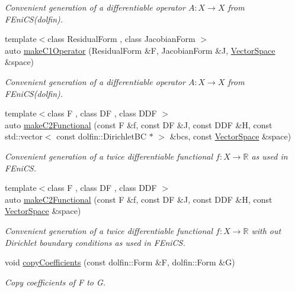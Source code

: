 \begin{DoxyCompactItemize}
\begin{DoxyCompactList}\small\item\em Convenient generation of a differentiable operator $A: X\rightarrow X$ from F\+Eni\+CS(dolfin). \end{DoxyCompactList}\item 
{\footnotesize template$<$class Residual\+Form , class Jacobian\+Form $>$ }\\auto \hyperlink{namespaceSpacy_1_1FEniCS_a508af586ecdbc9f099759ffec06e99df}{make\+C1\+Operator} (Residual\+Form \&F, Jacobian\+Form \&J, \hyperlink{classSpacy_1_1VectorSpace}{Vector\+Space} \&space)
\begin{DoxyCompactList}\small\item\em Convenient generation of a differentiable operator $A: X\rightarrow X$ from F\+Eni\+CS(dolfin). \end{DoxyCompactList}\item 
{\footnotesize template$<$class F , class DF , class D\+DF $>$ }\\auto \hyperlink{namespaceSpacy_1_1FEniCS_a78db716003d17d5f781dfcb13a183519}{make\+C2\+Functional} (const F \&f, const DF \&J, const D\+DF \&H, const std\+::vector$<$ const dolfin\+::\+Dirichlet\+BC $\ast$ $>$ \&bcs, const \hyperlink{classSpacy_1_1VectorSpace}{Vector\+Space} \&space)
\begin{DoxyCompactList}\small\item\em Convenient generation of a twice differentiable functional $f: X\rightarrow \mathbb{R}$ as used in F\+Eni\+CS. \end{DoxyCompactList}\item 
{\footnotesize template$<$class F , class DF , class D\+DF $>$ }\\auto \hyperlink{namespaceSpacy_1_1FEniCS_a4e69e5b7265feac21653bfc2da725a75}{make\+C2\+Functional} (const F \&f, const DF \&J, const D\+DF \&H, const \hyperlink{classSpacy_1_1VectorSpace}{Vector\+Space} \&space)
\begin{DoxyCompactList}\small\item\em Convenient generation of a twice differentiable functional $f: X\rightarrow \mathbb{R}$ with out Dirichlet boundary conditions as used in F\+Eni\+CS. \end{DoxyCompactList}\item 
void \hyperlink{group__FenicsGroup_gab3d4c7c1e91a50e4e816598258b6edce}{copy\+Coefficients} (const dolfin\+::\+Form \&F, dolfin\+::\+Form \&G)
\begin{DoxyCompactList}\small\item\em Copy coefficients of F to G. \end{DoxyCompactList}\item 

\end{DoxyCompactItemize}
